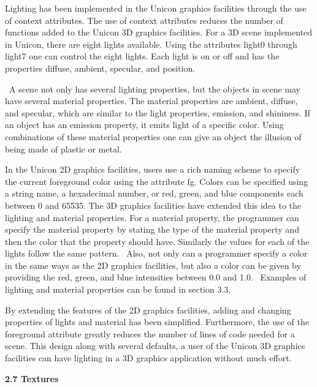 \documentclass[letterpaper]{article}
\newcommand\textstyleHeadingivChar[1]{\foreignlanguage{english}{#1}}
\begin{document}
{
Lighting has been implemented in the Unicon graphics facilities through the use of context attributes. The use of
context attributes reduces the number of functions added to the Unicon 3D graphics facilities. For a 3D scene
implemented in Unicon, there are eight lights available. Using the attributes \textsf{light0} through \textsf{light7}
one can control the eight lights. Each light is \textsf{on} or \textsf{off} and has the properties \textsf{diffuse},
\textsf{ambient}, \textsf{specular}, and \textsf{position}. }

{
\ A scene not only has several lighting properties, but the objects in scene may have several material properties. The
material properties are ambient, diffuse, and specular, which are similar to the light properties, emission, and
shininess. If an object has an emission property, it emits light of a specific color. Using combinations of these
material properties one can give an object the illusion of being made of plastic or metal. }

{
In the Unicon 2D graphics facilities, users use a rich naming scheme to specify the current foreground color using the
attribute \textsf{fg}. Colors can be specified using a string name, a hexadecimal number, or red, green, and blue
components each between \textsf{0} and \textsf{65535}. The 3D graphics facilities have extended this idea to the
lighting and material properties. For a material property, the programmer can specify the material property by stating
the type of the material property and then the color that the property should have. Similarly the values for each of
the lights follow the same pattern. \ Also, not only can a programmer specify a color in the same ways as the 2D
graphics facilities, but also a color can be given by providing the red, green, and blue intensities between
\textsf{0.0} and \textsf{1.0}. \ Examples of lighting and material properties can be found in section 3.3.}

{
By extending the features of the 2D graphics facilities, adding and changing properties of lights and material has been
simplified. Furthermore, the use of the foreground attribute greatly reduces the number of lines of code needed for a
scene. This design along with several defaults, a user of the Unicon 3D graphics facilities can have lighting in a 3D
graphics application without much effort. }


\bigskip

{
\textbf{2.7 Text}\textstyleHeadingivChar{\textbf{u}}\textbf{res }}
\end{document}
